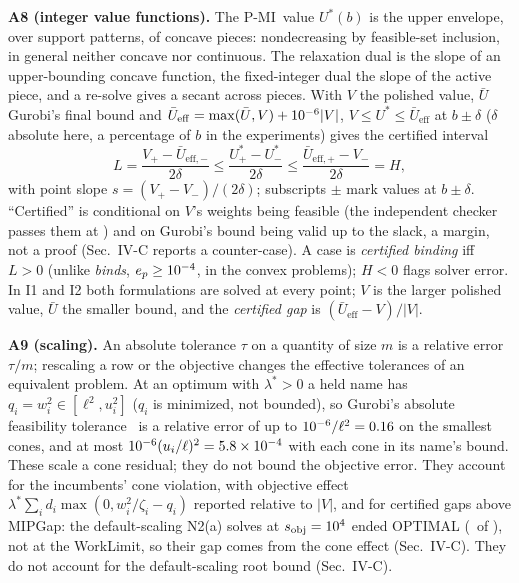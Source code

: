 \documentclass[conference]{IEEEtran}
\newcommand{\pmi}{\mbox{P-MI}}
\newcommand{\Ub}{\bar U}
\begin{document}
\textbf{A8 (integer value functions).} The \pmi\ value $U^*(b)$ is the upper envelope, over support patterns, of concave pieces: nondecreasing by feasible-set inclusion, in general neither concave nor continuous. The relaxation dual is the slope of an upper-bounding concave function, the fixed-integer dual the slope of the active piece, and a re-solve gives a secant across pieces. With $V$ the polished value, $\Ub$ Gurobi's final bound and $\Ub_{\mathrm{eff}}=\max(\Ub,V)+\BeffSlack|V|$, $V\le U^*\le\Ub_{\mathrm{eff}}$ at $b\pm\delta$ ($\delta$ absolute here, a percentage of $b$ in the experiments) gives the certified interval
\begin{equation}
L=\frac{V_+-\Ub_{\mathrm{eff},-}}{2\delta}\le\frac{U^*_+-U^*_-}{2\delta}\le\frac{\Ub_{\mathrm{eff},+}-V_-}{2\delta}=H,
\end{equation}
with point slope $s=(V_+-V_-)/(2\delta)$; subscripts $\pm$ mark values at $b\pm\delta$. ``Certified'' is conditional on $V$'s weights being feasible (the independent checker passes them at \VerdictTol) and on Gurobi's bound being valid up to the slack, a margin, not a proof (Sec.~IV-C reports a counter-case). A case is \emph{certified binding} iff $L>0$ (unlike \emph{binds}, $e_p\ge10^{-4}$, in the convex problems); $H<0$ flags solver error. In I1 and I2 both formulations are solved at every point; $V$ is the larger polished value, $\Ub$ the smaller bound, and the \emph{certified gap} is $(\Ub_{\mathrm{eff}}-V)/|V|$.

\textbf{A9 (scaling).} An absolute tolerance $\tau$ on a quantity of size $m$ is a relative error $\tau/m$; rescaling a row or the objective changes the effective tolerances of an equivalent problem. At an optimum with $\lambda^*>0$ a held name has $q_i=w_i^2\in[\ell^2,u_i^2]$ ($q_i$ is minimized, not bounded), so Gurobi's absolute feasibility tolerance \GurobiFeasTol\ is a relative error of up to $10^{-6}/\ell^2=0.16$ on the smallest cones, and at most $10^{-6}(u_i/\ell)^2=5.8\times10^{-4}$ with each cone in its name's bound. These scale a cone residual; they do not bound the objective error. They account for the incumbents' cone violation, with objective effect $\lambda^*\sum_id_i\max(0,w_i^2/\zeta_i-q_i)$ reported relative to $|V|$, and for certified gaps above MIPGap: the default-scaling N2(a) solves at $s_{\mathrm{obj}}=10^{4}$ ended OPTIMAL (\NTwoDefScaledOpt\ of \NTwoDefScaledN), not at the WorkLimit, so their gap comes from the cone effect (Sec.~IV-C). They do not account for the default-scaling root bound (Sec.~IV-C).
\end{document}
